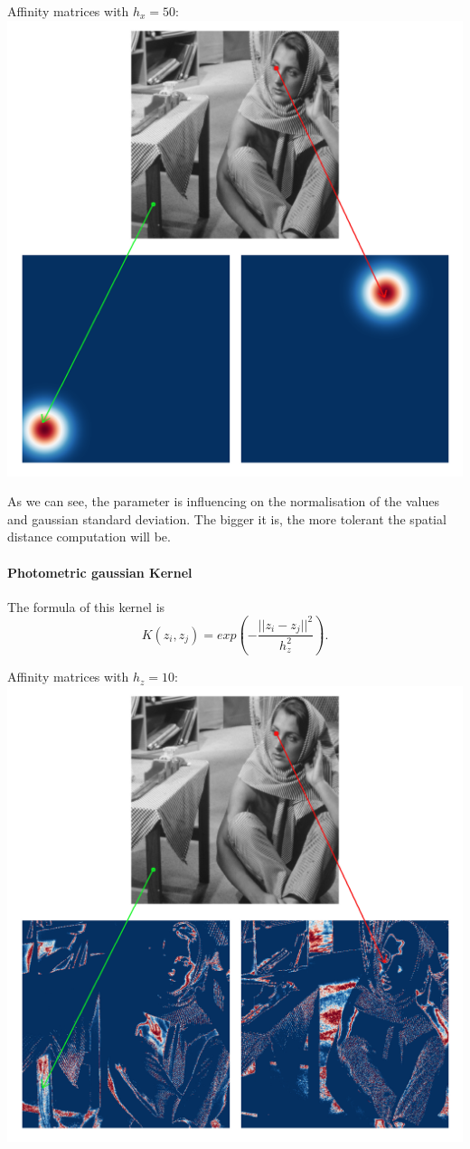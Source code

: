Affinity matrices with \(h_x = 50\): \\
\includegraphics[width=\textwidth]{img/spatialAffinitySigma50.png}

As we can see, the parameter is influencing on the normalisation of the values and gaussian standard deviation.
The bigger it is, the more tolerant the spatial distance computation will be.

\paragraph{Photometric gaussian Kernel}
The formula of this kernel is
\[K(z_i, z_j) = exp(-\frac{||z_i - z_j||^2}{h_z^2}).\]

Affinity matrices with \(h_z = 10\): \\
\includegraphics[width=\textwidth]{img/photometricAffinitySigma10.png}

